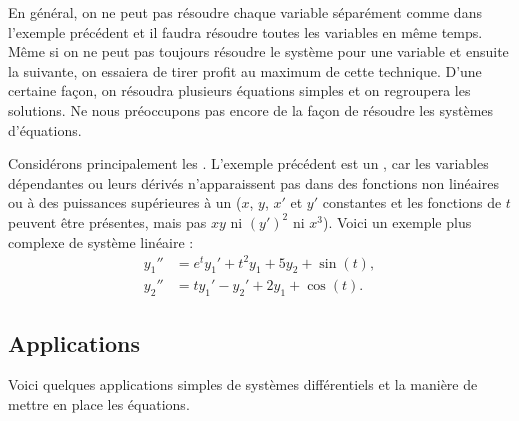En général, on ne peut pas résoudre chaque variable séparément comme dans l'exemple précédent et il faudra résoudre toutes les variables en même temps. Même si on ne peut pas toujours résoudre le système pour une variable et ensuite la suivante, on essaiera de tirer profit au maximum de cette technique. D’une certaine façon, on résoudra plusieurs équations simples et on regroupera les solutions. Ne nous préoccupons pas encore de la façon de résoudre les systèmes d’équations.

Considérons principalement les \emph{}.  L’exemple précédent est un \emph{}, car les variables dépendantes ou leurs dérivés n'apparaissent pas dans des fonctions non linéaires ou à des puissances supérieures à un ($x$, $y$, $x'$ et $y'$ constantes et les fonctions de $t$
peuvent être présentes, mais pas $xy$ ni ${(y')}^2$ ni $x^3$).  Voici un exemple plus complexe de système linéaire :
\begin{align*}
y_1'' &= e^t y_1' + t^2 y_1 + 5 y_2 + \sin(t), \\
y_2'' &= t y_1'-y_2' + 2 y_1 + \cos(t).
\end{align*}

\subsection{Applications}

Voici quelques applications simples de systèmes différentiels et la manière de mettre en place les équations.

